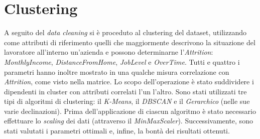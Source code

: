 \section{Clustering}
A seguito del \textit{data cleaning} si è proceduto al clustering del dataset, utilizzando come attributi di riferimento quelli che maggiormente descrivono la situazione del lavoratore all’interno un’azienda e possono determinarne l’\textit{Attrition}: \textit{MonthlyIncome}, \textit{DistanceFromHome}, \textit{JobLevel} e \textit{OverTime}. Tutti e quattro i parametri hanno inoltre mostrato in una qualche misura correlazione con \textit{Attrition}, come visto nella matrice. Lo scopo dell’operazione è stato suddividere i dipendenti in cluster con attributi correlati l’un l’altro.
Sono stati utilizzati tre tipi di algoritmi di clustering: il \textit{K-Means}, il \textit{DBSCAN} e il \textit{Gerarchico} (nelle sue varie declinazioni). Prima dell’applicazione di ciascun algoritmo è stato necessario effettuare lo \textit{scaling} dei dati (attraverso il \textit{MinMaxScaler}). Successivamente, sono stati valutati i parametri ottimali e, infine, la bontà dei risultati ottenuti.
